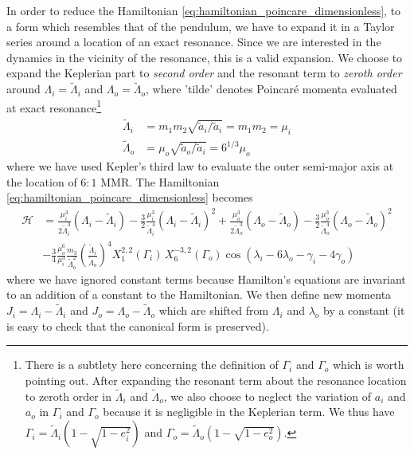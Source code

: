 \documentclass[ twoside,openright,titlepage,numbers=noenddot,headinclude,%
                footinclude=true,cleardoublepage=empty,abstractoff, %
                BCOR=5mm,paper=a4,fontsize=11pt,%
                american,%
                ]{scrreprt}
\begin{document}
In order to reduce the Hamiltonian \ref{eq:hamiltonian_poincare_dimensionless},
to a form which resembles that of the pendulum, we have to expand it in a 
Taylor series around a location of an exact resonance. Since we are interested
in the dynamics in the vicinity of the resonance, this is a valid expansion.
We choose to expand the Keplerian part to \emph{second order} and the
resonant term to \emph{zeroth order} around $\Lambda_i=\tilde{\Lambda}_i$ 
and $\Lambda_o=\tilde{\Lambda}_o$, where 'tilde' denotes Poincaré
momenta evaluated at exact resonance\footnote{There is a subtlety  here concerning the
definition of $\Gamma_i$ and $\Gamma_o$ which is worth pointing out. After expanding the
resonant term about the resonance location to zeroth order in 
$\tilde{\Lambda}_i$ and $\tilde{\Lambda}_o$, we also choose to neglect
the variation of $a_i$ and $a_o$ in $\Gamma_i$ and $\Gamma_o$
because it is negligible in the Keplerian term. 
We thus have $\Gamma_i=\tilde{\Lambda}_i\left(1-\sqrt{1-e_i^2}\right)$ and
$\Gamma_o=\tilde{\Lambda}_o\left(1-\sqrt{1-e_o^2}\right)$.}
\begin{equation}
    \begin{aligned}
        \tilde{\Lambda}_i&=m_1m_2\sqrt{\tilde{a}_i/\tilde{a}_i}=m_1m_2=\mu_i\\
        \tilde{\Lambda}_o&=\mu_o\sqrt{\tilde{a}_o/\tilde{a}_i}=6^{1/3}\mu_o
    \end{aligned}
\end{equation}
where we have used Kepler's third law to evaluate the outer semi-major axis
at the location of $6:1$ MMR. The Hamiltonian 
\ref{eq:hamiltonian_poincare_dimensionless} becomes
\begin{equation}
    \begin{aligned}
        \mathcal{H}&=\frac{\mu_i^3}{2\tilde{\Lambda}_i^3}
        (\Lambda_i-\tilde{\Lambda}_i) - \frac{3}{2}
        \frac{\mu_i^3}{\tilde{\Lambda}_i^4} (\Lambda_i-\tilde{\Lambda}_i)^2+
    \frac{\mu_o^3}{2\tilde{\Lambda}_o^3}
        (\Lambda_o-\tilde{\Lambda}_o) - \frac{3}{2}
        \frac{\mu_o^3}{\tilde{\Lambda}_o^4} (\Lambda_o-\tilde{\Lambda}_o)^2\\
        &-\frac{3}{4} \frac{\mu_o^6}{\mu_i^3} 
        \frac{m_3}{\tilde{\Lambda}_o^2} \left(\frac{\tilde{\Lambda}_i}
        {\tilde{\Lambda}_o}\right)^4
    X^{2,2}_1(\Gamma_i)\,X^{-3,2}_6(\Gamma_o)\cos(\lambda_i-6\lambda_o
    -\gamma_i - 4\gamma_o)
    \end{aligned}
    \label{eq:hamiltonian_poincare_dimensionless_expanded}
\end{equation}
where we have ignored constant terms because Hamilton's equations are invariant
to an addition of a constant to the Hamiltonian. We then define new momenta
$J_i=\Lambda_i-\tilde{\Lambda}_i$ and $J_o=\Lambda_o-\tilde{\Lambda}_o$ 
which are shifted from $\Lambda_i$ and $\lambda_o$ by a constant (it is easy 
to check that the canonical form is preserved).
\end{document}
